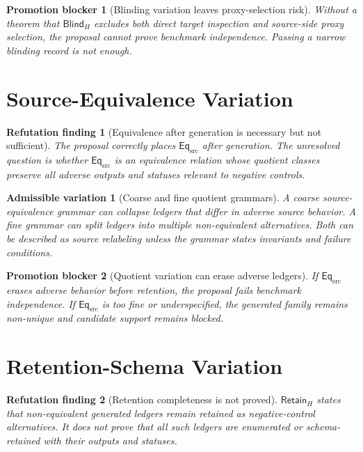 \documentclass[11pt]{article}
\newcommand{\BlindH}{\mathsf{Blind}_{H}}
\newcommand{\EqSrc}{\mathsf{Eq}_{\mathrm{src}}}
\newcommand{\RetainH}{\mathsf{Retain}_{H}}
\newtheorem{finding}{Refutation finding}
\newtheorem{variation}{Admissible variation}
\newtheorem{blocker}{Promotion blocker}
\begin{document}
\begin{blocker}[Blinding variation leaves proxy-selection risk]
Without a theorem that \(\BlindH\) excludes both direct target inspection and
source-side proxy selection, the proposal cannot prove benchmark
independence. Passing a narrow blinding record is not enough.
\end{blocker}

\section{Source-Equivalence Variation}

\begin{finding}[Equivalence after generation is necessary but not sufficient]
The proposal correctly places \(\EqSrc\) after generation. The unresolved
question is whether \(\EqSrc\) is an equivalence relation whose quotient
classes preserve all adverse outputs and statuses relevant to negative
controls.
\end{finding}

\begin{variation}[Coarse and fine quotient grammars]
A coarse source-equivalence grammar can collapse ledgers that differ in
adverse source behavior. A fine grammar can split ledgers into multiple
non-equivalent alternatives. Both can be described as source relabeling
unless the grammar states invariants and failure conditions.
\end{variation}

\begin{blocker}[Quotient variation can erase adverse ledgers]
If \(\EqSrc\) erases adverse behavior before retention, the proposal fails
benchmark independence. If \(\EqSrc\) is too fine or underspecified, the
generated family remains non-unique and candidate support remains blocked.
\end{blocker}

\section{Retention-Schema Variation}

\begin{finding}[Retention completeness is not proved]
\(\RetainH\) states that non-equivalent generated ledgers remain retained as
negative-control alternatives. It does not prove that all such ledgers are
enumerated or schema-retained with their outputs and statuses.
\end{finding}
\end{document}
